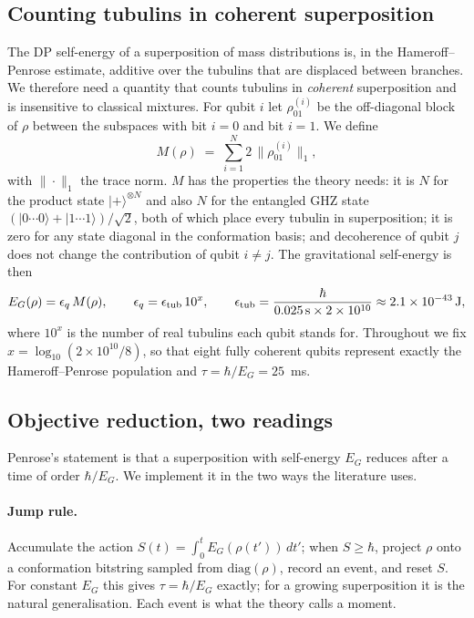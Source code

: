 \documentclass[11pt]{article}
\begin{document}
\subsection{Counting tubulins in coherent superposition}
The DP self-energy of a superposition of mass distributions is, in the Hameroff--Penrose estimate, additive over the tubulins that are displaced between branches. We therefore need a quantity that counts tubulins in \emph{coherent} superposition and is insensitive to classical mixtures. For qubit $i$ let $\rho^{(i)}_{01}$ be the off-diagonal block of $\rho$ between the subspaces with bit $i=0$ and bit $i=1$. We define
\begin{equation}
M(\rho) \;=\; \sum_{i=1}^{N} 2\,\big\|\rho^{(i)}_{01}\big\|_1 ,
\label{eq:M}
\end{equation}
with $\|\cdot\|_1$ the trace norm. $M$ has the properties the theory needs: it is $N$ for the product state $|{+}\rangle^{\otimes N}$ and also $N$ for the entangled GHZ state $(|0\cdots0\rangle+|1\cdots1\rangle)/\sqrt2$, both of which place every tubulin in superposition; it is zero for any state diagonal in the conformation basis; and decoherence of qubit $j$ does not change the contribution of qubit $i\neq j$. The gravitational self-energy is then
\begin{equation}
E_G(\rho) = \epsilon_q\,M(\rho), \qquad \epsilon_q = \epsilon_{\rm tub}\,10^{x},\qquad \epsilon_{\rm tub}=\frac{\hbar}{0.025\,\mathrm{s}\times 2\times10^{10}}\approx 2.1\times10^{-43}\,\mathrm{J},
\end{equation}
where $10^{x}$ is the number of real tubulins each qubit stands for. Throughout we fix $x=\log_{10}(2\times10^{10}/8)$, so that eight fully coherent qubits represent exactly the Hameroff--Penrose population and $\tau=\hbar/E_G=25$~ms.

\subsection{Objective reduction, two readings}
Penrose's statement is that a superposition with self-energy $E_G$ reduces after a time of order $\hbar/E_G$. We implement it in the two ways the literature uses.

\paragraph{Jump rule.} Accumulate the action $S(t)=\int_0^t E_G(\rho(t'))\,dt'$; when $S\ge\hbar$, project $\rho$ onto a conformation bitstring sampled from $\mathrm{diag}(\rho)$, record an event, and reset $S$. For constant $E_G$ this gives $\tau=\hbar/E_G$ exactly; for a growing superposition it is the natural generalisation. Each event is what the theory calls a moment.
\end{document}

